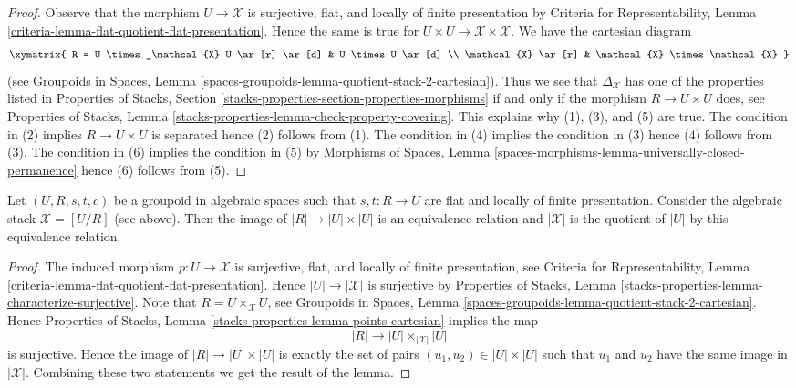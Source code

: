 \begin{proof}
Observe that the morphism $U \to \mathcal{X}$ is surjective, flat, and
locally of finite presentation by
Criteria for Representability, Lemma
\ref{criteria-lemma-flat-quotient-flat-presentation}.
Hence the same is true for $U \times U \to \mathcal{X} \times \mathcal{X}$.
We have the cartesian diagram
$$
\xymatrix{
R  = U \times_\mathcal{X} U \ar[r] \ar[d] & U \times U \ar[d] \\
\mathcal{X} \ar[r] & \mathcal{X} \times \mathcal{X}
}
$$
(see Groupoids in Spaces, Lemma
\ref{spaces-groupoids-lemma-quotient-stack-2-cartesian}).
Thus we see that $\Delta_\mathcal{X}$ has one of the properties listed in
Properties of Stacks, Section
\ref{stacks-properties-section-properties-morphisms}
if and only if the morphism $R \to U \times U$ does, see
Properties of Stacks, Lemma
\ref{stacks-properties-lemma-check-property-covering}.
This explains why (1), (3), and (5) are true.
The condition in (2) implies $R \to U \times U$ is separated
hence (2) follows from (1).
The condition in (4) implies the condition in (3)
hence (4) follows from (3).
The condition in (6) implies the condition in (5)
by Morphisms of Spaces, Lemma
\ref{spaces-morphisms-lemma-universally-closed-permanence}
hence (6) follows from (5).
\end{proof}

\begin{lemma}
\label{lemma-points-presentation}
Let $(U, R, s, t, c)$ be a groupoid in algebraic spaces such that
$s, t : R \to U$ are flat and locally of finite presentation.
Consider the algebraic stack $\mathcal{X} = [U/R]$ (see above).
Then the image of $|R| \to |U| \times |U|$ is an equivalence relation
and $|\mathcal{X}|$ is the quotient of $|U|$ by this equivalence relation.
\end{lemma}

\begin{proof}
The induced morphism $p : U \to \mathcal{X}$ is surjective, flat,
and locally of finite presentation, see
Criteria for Representability, Lemma
\ref{criteria-lemma-flat-quotient-flat-presentation}.
Hence $|U| \to |\mathcal{X}|$ is surjective by
Properties of Stacks, Lemma
\ref{stacks-properties-lemma-characterize-surjective}.
Note that $R = U \times_\mathcal{X} U$, see
Groupoids in Spaces,
Lemma \ref{spaces-groupoids-lemma-quotient-stack-2-cartesian}.
Hence
Properties of Stacks, Lemma \ref{stacks-properties-lemma-points-cartesian}
implies the map
$$
|R| \longrightarrow |U| \times_{|\mathcal{X}|} |U|
$$
is surjective. Hence the image of $|R| \to |U| \times |U|$ is
exactly the set of pairs $(u_1, u_2) \in |U| \times |U|$
such that $u_1$ and $u_2$ have the same image in $|\mathcal{X}|$.
Combining these two statements we get the result of the lemma.
\end{proof}






